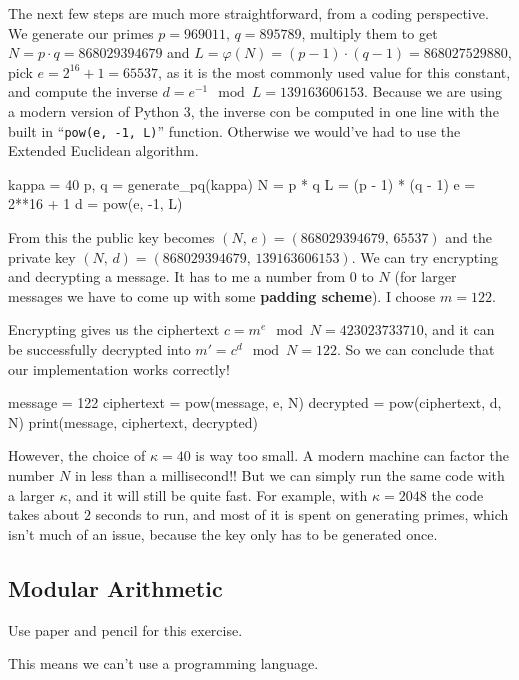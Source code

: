 \documentclass{article}
\let\phi\varphi
\begin{document}
  The next few steps are much more straightforward, from a coding perspective.
  We generate our primes $p = 969011,\, q = 895789$,
  multiply them to get $N = p \cdot q = 868029394679$ and $L = \phi(N) = (p-1)\cdot(q-1) = 868027529880$,
  pick $e = 2^{16} + 1 = 65537$, as it is the most commonly used value for this constant,
  and compute the inverse $d = e^{-1} \mod L = 139163606153$.
  Because we are using a modern version of Python 3,
  the inverse con be computed in one line with the built in ``\texttt{pow(e, -1, L)}'' function.
  Otherwise we would've had to use the Extended Euclidean algorithm.
  \begin{mylisting}
    kappa = 40
    p, q = generate_pq(kappa)
    N = p * q
    L = (p - 1) * (q - 1)
    e = 2**16 + 1
    d = pow(e, -1, L)
  \end{mylisting}

  From this the public key becomes $(N,\, e) = (868029394679,\, 65537)$
  and the private key $(N,\, d) = (868029394679,\, 139163606153)$.
  We can try encrypting and decrypting a message.
  It has to me a number from $0$ to $N$ (for larger messages we have to come up with some \textbf{padding scheme}).
  I choose $m = 122$.

  Encrypting gives us the ciphertext $c = m^e \mod N = 423023733710$,
  and it can be successfully decrypted into $m' = c^d \mod N = 122$.
  So we can conclude that our implementation works correctly!
  \begin{mylisting}
    message = 122
    ciphertext = pow(message, e, N)
    decrypted = pow(ciphertext, d, N)
    print(message, ciphertext, decrypted)
  \end{mylisting}

  However, the choice of $\kappa=40$ is way too small. A modern machine can factor the number $N$ in less than a millisecond!!
  But we can simply run the same code with a larger $\kappa$, and it will still be quite fast.
  For example, with $\kappa = 2048$ the code takes about $2$ seconds to run, and most of it is spent on generating primes,
  which isn't much of an issue, because the key only has to be generated once.

  \subsection{Modular Arithmetic}
  \begin{centerframebox}
    Use paper and pencil for this exercise.
  \end{centerframebox}
  This means we can't use a programming language.
\end{document}

